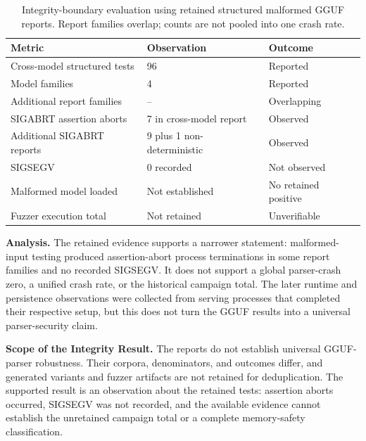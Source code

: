 \documentclass[journal,tifs]{IEEEtran}
\begin{document}
\begin{table}[!t]
\centering
\caption{Integrity-boundary evaluation using retained structured malformed
GGUF reports. Report families overlap; counts are not pooled into one crash
rate.}
\label{tab:model_boundary_results} 

\scriptsize
\begin{tabular}{@{}p{}p{}p{}@{}}
\toprule
\textbf{Metric} & \textbf{Observation} & \textbf{Outcome} \\
\midrule
Cross-model structured tests & 96 & Reported \\
Model families             & 4                 & Reported   \\
Additional report families & -- & Overlapping \\
\midrule
SIGABRT assertion aborts   & 7 in cross-model report & Observed \\
Additional SIGABRT reports & 9 plus 1 non-deterministic & Observed \\
SIGSEGV                    & 0 recorded          & Not observed \\
Malformed model loaded     & Not established     & No retained positive \\
Fuzzer execution total     & Not retained        & Unverifiable \\
\bottomrule
\end{tabular}
\end{table}



{\bf Analysis.}
The retained evidence supports a narrower statement: malformed-input
testing produced assertion-abort process terminations in some report
families and no recorded SIGSEGV. It does not support a global parser-crash
zero, a unified crash rate, or the historical campaign total. The later
runtime and persistence observations were collected from serving processes
that completed their respective setup, but this does not turn the GGUF
results into a universal parser-security claim.


{\bf Scope of the Integrity Result.}
The reports do not establish universal GGUF-parser robustness. Their
corpora, denominators, and outcomes differ, and generated variants and
fuzzer artifacts are not retained for deduplication. The supported result
is an observation about the retained tests: assertion aborts occurred,
SIGSEGV was not recorded, and the available evidence cannot establish the
unretained campaign total or a complete memory-safety classification.
\end{document}
